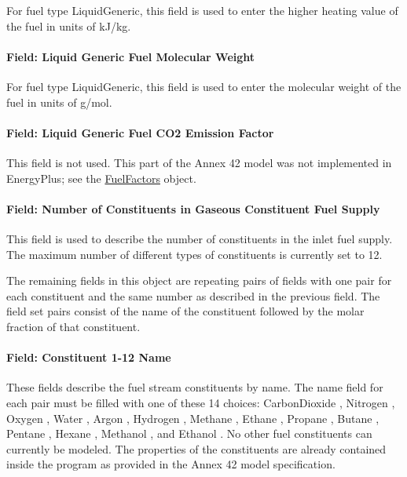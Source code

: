For fuel type LiquidGeneric, this field is used to enter the higher heating value of the fuel in units of kJ/kg.

\paragraph{Field: Liquid Generic Fuel Molecular Weight}\label{field-liquid-generic-fuel-molecular-weight}

For fuel type LiquidGeneric, this field is used to enter the molecular weight of the fuel in units of g/mol.

\paragraph{Field: Liquid Generic Fuel CO2 Emission Factor}\label{field-liquid-generic-fuel-co2-emission-factor}

This field is not used. This part of the Annex 42 model was not implemented in EnergyPlus; see the \hyperref[fuelfactors]{FuelFactors} object.

\paragraph{Field: Number of Constituents in Gaseous Constituent Fuel Supply}\label{field-number-of-constituents-in-gaseous-constituent-fuel-supply}

This field is used to describe the number of constituents in the inlet fuel supply. The maximum number of different types of constituents is currently set to 12.

The remaining fields in this object are repeating pairs of fields with one pair for each constituent and the same number as described in the previous field. The field set pairs consist of the name of the constituent followed by the molar fraction of that constituent.

\paragraph{Field: Constituent 1-12 Name}\label{field-constituent-1-12-name}

These fields describe the fuel stream constituents by name. The name field for each pair must be filled with one of these 14 choices: CarbonDioxide , Nitrogen , Oxygen , Water , Argon , Hydrogen , Methane , Ethane , Propane , Butane , Pentane , Hexane , Methanol , and Ethanol . No other fuel constituents can currently be modeled. The properties of the constituents are already contained inside the program as provided in the Annex 42 model specification.

